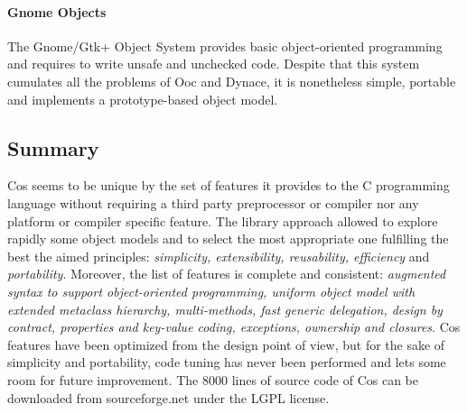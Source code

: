 \documentclass[preprint,10pt]{sigplanconf}
\newcommand{\ProgLang}[1]{{\sc #1}\xspace}
\newcommand{\Cos}       {\ProgLang{Cos}}
\begin{document}
\paragraph{Gnome Objects}

The Gnome/Gtk+ Object System provides basic object-oriented programming and requires to write unsafe and unchecked code. Despite that this system cumulates all the problems of Ooc and Dynace, it is nonetheless simple, portable and implements a prototype-based object model.
















































\subsection{Summary}

\Cos seems to be unique by the set of features it provides to the C programming language without requiring a third party preprocessor or compiler nor any platform or compiler specific  feature. The library approach allowed to explore rapidly some object models and to select the most appropriate one fulfilling the best the aimed principles: {\em simplicity, extensibility, reusability, efficiency} and {\em portability}. Moreover, the list of features is complete and consistent: {\em augmented syntax to support object-oriented programming, uniform object model with extended metaclass hierarchy, multi-methods, fast generic delegation, design by contract, properties and key-value coding, exceptions, ownership and closures}.
\Cos features have been optimized from the design point of view, but for the sake of simplicity and portability, code tuning has never been performed 
and lets some room for future improvement. The $8000$ lines of source code of \Cos can be downloaded from sourceforge.net under the LGPL license.
\end{document}
